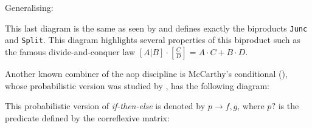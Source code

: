 \documentclass[
  oneside,
  11pt, a4paper,
  footinclude=true,
  headinclude=true,
  cleardoublepage=empty
]{scrbook}
\theoremstyle{definition}
\theoremstyle{definition}
\begin{document}
        Generalising:
        
        \begin{center}
        \end{center}{}
        
        This last diagram is the same as seen by \cite{Macedo2012MatricesAA} and defines exactly the biproducts \texttt{Junc} and \texttt{Split}. This diagram highlights several properties of this biproduct such as the famous divide-and-conquer law $[A|B] \cdot [\frac{C}{D}] = A \cdot C + B \cdot D$.
        
        Another known combiner of the \gls{aop} discipline is McCarthy's conditional (\cite{Bird:1997:AP:248932}), whose probabilistic version was studied by \cite{oliveira2012towards}, has the following diagram:
        
        \begin{center}\label{dig-mccarthy}
        \end{center}{}
        
        This probabilistic version of \emph{if-then-else} is denoted by $p \rightarrow f,g$, where $p?$ is the predicate defined by the correflexive matrix:
        
        \begin{center}
        \end{center}{}
        
\end{document}
